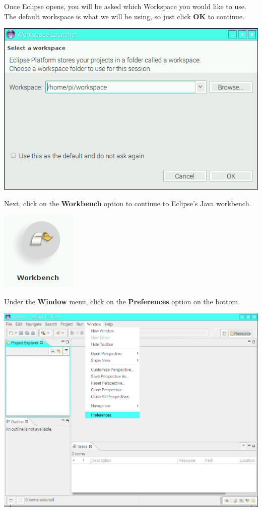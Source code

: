Once Eclipse opens, you will be asked which Workspace you would like to use. The default workspace is what we will be using, so just click \textbf{OK} to continue.

\beforefig
\centerline{\includegraphics[height=2.5 in]{pi_images/setup/ConfigureEclipse2.jpg}}
\afterfig

Next, click on the \textbf{Workbench} option to continue to Eclipse's Java workbench.

\beforefig
\centerline{\includegraphics[height=1.5 in]{pi_images/setup/ConfigureEclipse3.jpg}}
\afterfig

Under the \textbf{Window} menu, click on the \textbf{Preferences} option on the bottom.

\beforefig
\centerline{\includegraphics[height=3.0 in]{pi_images/setup/ConfigureEclipse4.jpg}}
\afterfig

